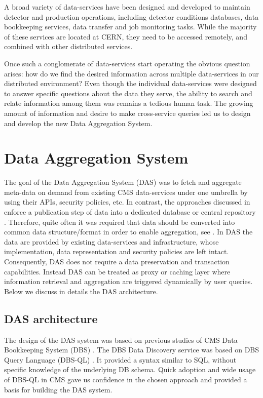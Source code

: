 \documentclass[1p,times]{elsarticle}
\begin{document}
A broad variety of data-services have been designed and developed to
maintain detector and production operations, including detector
conditions databases, data bookkeeping services,
data transfer and job monitoring tasks. While the majority of these
services are located at CERN, they need to be accessed remotely, and
combined with other distributed services.

Once such a conglomerate of data-services start operating the obvious
question arises: how do we find the desired information across multiple data-services
in our distributed environment? Even though the individual data-services were designed
to answer specific questions about the data they serve, the ability to search and relate
information among them was remains a tedious human task. The growing amount of information
and desire to make cross-service queries led us to design and develop the new
Data Aggregation System.

\section{Data Aggregation System\label{DAS}}
The goal of the Data Aggregation System (DAS) was to fetch and aggregate meta-data 
on demand from existing CMS data-services under one umbrella by using their APIs, 
security policies, etc. In contrast, the approaches
discussed in \cite{DBXplorer, QueryAnswer, FedDB}
enforce a publication step of data into a dedicated database 
or central repository \cite{iRODS}. Therefore, quite often it was required
that data should be converted into common data structure/format in order to enable
aggregation, see \cite{OpenArchive}. In DAS the data are provided
by existing data-services and infrastructure, whose implementation,
data representation and security policies are left intact. Consequently,
DAS does not require a data preservation and transaction capabilities. 
Instead DAS can be treated as proxy or caching layer where information 
retrieval and aggregation are triggered dynamically by user queries. 
Below we discuss in details the DAS architecture.

\subsection{DAS architecture}
The design of the DAS system was based on previous studies of CMS Data 
Bookkeeping System (DBS) \cite{DBS, DBS07}. The DBS Data Discovery service
\cite{DD} was based on DBS Query Language (DBS-QL) \cite{DBS-QL}. It provided
a syntax similar to SQL, without specific knowledge of the underlying DB schema.
Quick adoption and wide usage of DBS-QL in CMS gave us confidence in the chosen approach 
and provided a basis for building the DAS system.
\end{document}
